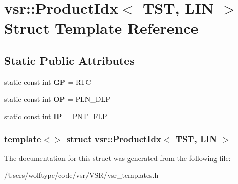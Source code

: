 \hypertarget{structvsr_1_1_product_idx_3_01_t_s_t_00_01_l_i_n_01_4}{\section{vsr\-:\-:Product\-Idx$<$ T\-S\-T, L\-I\-N $>$ Struct Template Reference}
\label{structvsr_1_1_product_idx_3_01_t_s_t_00_01_l_i_n_01_4}
}
\subsection*{Static Public Attributes}
\begin{DoxyCompactItemize}
\item 
\hypertarget{structvsr_1_1_product_idx_3_01_t_s_t_00_01_l_i_n_01_4_aaab50fb4d4bb7163ecb2e848b45c8bb1}{static const int {\bfseries G\-P} = R\-T\-C}\label{structvsr_1_1_product_idx_3_01_t_s_t_00_01_l_i_n_01_4_aaab50fb4d4bb7163ecb2e848b45c8bb1}

\item 
\hypertarget{structvsr_1_1_product_idx_3_01_t_s_t_00_01_l_i_n_01_4_aac770116477c64cac97465154ae7bb97}{static const int {\bfseries O\-P} = P\-L\-N\-\_\-\-D\-L\-P}\label{structvsr_1_1_product_idx_3_01_t_s_t_00_01_l_i_n_01_4_aac770116477c64cac97465154ae7bb97}

\item 
\hypertarget{structvsr_1_1_product_idx_3_01_t_s_t_00_01_l_i_n_01_4_ae3f4d46ebda10f95a30a3eb377378d99}{static const int {\bfseries I\-P} = P\-N\-T\-\_\-\-F\-L\-P}\label{structvsr_1_1_product_idx_3_01_t_s_t_00_01_l_i_n_01_4_ae3f4d46ebda10f95a30a3eb377378d99}

\end{DoxyCompactItemize}
\subsubsection*{template$<$$>$ struct vsr\-::\-Product\-Idx$<$ T\-S\-T, L\-I\-N $>$}



The documentation for this struct was generated from the following file\-:\begin{DoxyCompactItemize}
\item 
/\-Users/wolftype/code/vsr/\-V\-S\-R/vsr\-\_\-templates.\-h\end{DoxyCompactItemize}
